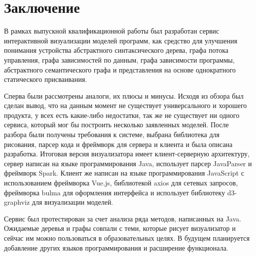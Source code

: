 \chapter*{Заключение} \label{ch-conclusion}
В рамках выпускной квалификационной работы был разработан сервис интерактивной визуализации моделей программ, как средство для улучшения понимания устройства абстрактного синтаксического дерева, графа потока управления, графа зависимостей по данным, графа зависимости программы, абстрактного семантического графа и представления на основе однократного статического присваивания. 

Сперва были рассмотрены аналоги, их плюсы и минусы. Исходя из обзора был сделан вывод, что на данным момент не существует универсального и хорошего продукта, у всех есть какие-либо недостатки, так же не существует ни одного сервиса, который мог бы построить несколько заявленных моделей. После разбора были получены требования к системе, выбрана библиотека для рисования, парсер кода и фреймворк для сервера и клиента и была описана разработка. Итоговая версия визуализатора имеет клиент-серверную архитектуру, сервер написан на языке программирования Java, использует парсер JavaParser и фреймворк Spark. Клиент же написан на языке программирования JavaScript с использованием фреймворка Vue.js, библиотекой axios для сетевых запросов, фреймворка bulma для оформления интерфейса и использует библиотеку d3-graphviz для визуализации моделей.

Сервис был протестирован за счет анализа ряда методов, написанных на Java. Ожидаемые деревья и графы совпали с теми, которые рисует визуализатор и сейчас им можно пользоваться в образовательных целях. В будущем планируется добавление других языков программирования и расширение функционала.
\newpage